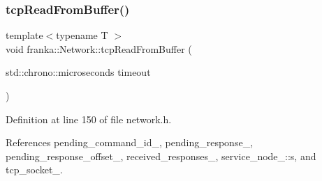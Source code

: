 \subsubsection{\texorpdfstring{tcp\+Read\+From\+Buffer()}{tcpReadFromBuffer()}}
{\footnotesize\ttfamily template$<$typename T $>$ \\
void franka\+::\+Network\+::tcp\+Read\+From\+Buffer (\begin{DoxyParamCaption}\item[{std\+::chrono\+::microseconds}]{timeout }\end{DoxyParamCaption})\hspace{0.3cm}{\ttfamily [private]}}



Definition at line 150 of file network.\+h.



References pending\+\_\+command\+\_\+id\+\_\+, pending\+\_\+response\+\_\+, pending\+\_\+response\+\_\+offset\+\_\+, received\+\_\+responses\+\_\+, service\+\_\+node\+\_\+::s, and tcp\+\_\+socket\+\_\+.


